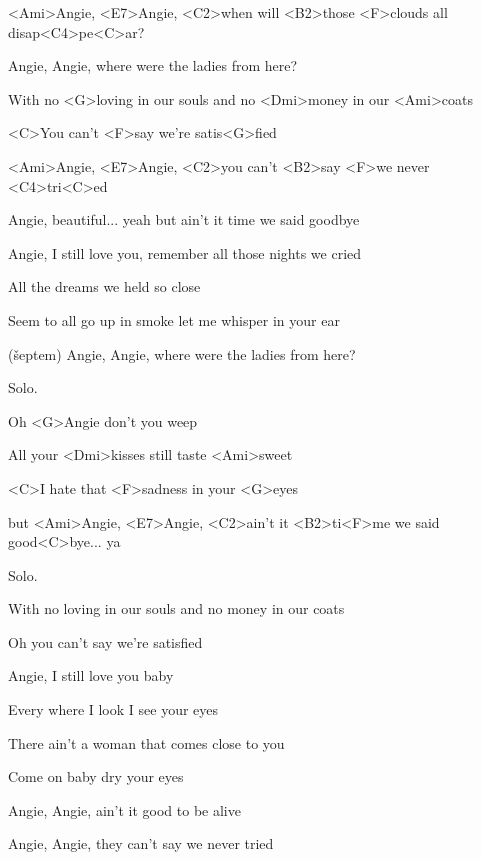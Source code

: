 

\zs
<Ami>Angie, <E7>Angie, <C2>when will <B2>those <F>clouds all disap<C4>pe<C>ar?

Angie, Angie, where were the ladies from here?
\ks

\zr
With no <G>loving in our souls and no <Dmi>money in our <Ami>coats

<C>You can't <F>say we're satis<G>fied

<Ami>Angie, <E7>Angie, <C2>you can't <B2>say <F>we never <C4>tri<C>ed
\kr

\zs
Angie, beautiful... yeah but ain't it time we said goodbye

Angie, I still love you, remember all those nights we cried
\ks

\zr
All the dreams we held so close

Seem to all go up in smoke let me whisper in your ear

(šeptem) Angie, Angie, where were the ladies from here?
\kr

Solo.

\zr
Oh <G>Angie don't you weep

All your <Dmi>kisses still taste <Ami>sweet

<C>I hate that <F>sadness in your <G>eyes

but <Ami>Angie, <E7>Angie, <C2>ain't it <B2>ti<F>me we said good<C>bye... ya
\kr

Solo.

\zr
With no loving in our souls
and no money in our coats

Oh you can't say we're satisfied
\kr

\zs
Angie, I still love you baby

Every where I look I see your eyes
\ks

\zs
There ain't a woman that comes close to you

Come on baby dry your eyes

Angie, Angie, ain't it good to be alive

Angie, Angie, they can't say we never tried
\ks

\kp
